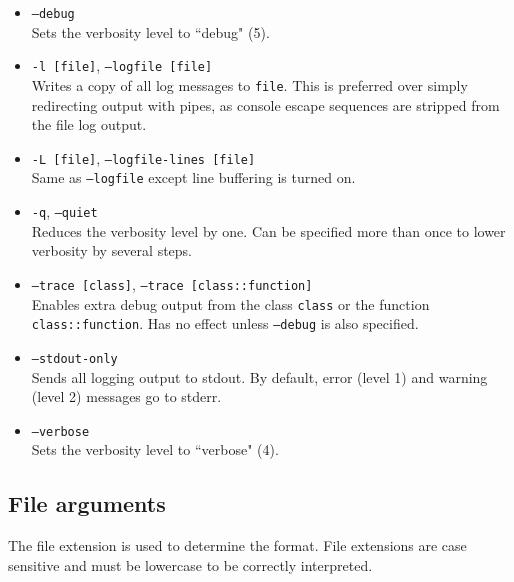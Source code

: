 \begin{itemize}

\item \texttt{--debug}\\
Sets the verbosity level to ``debug" (5).

\item \texttt{-l [file]}, \texttt{--logfile [file]}\\
Writes a copy of all log messages to \texttt{file}. This is preferred over simply redirecting output with pipes, as
console escape sequences are stripped from the file log output.

\item \texttt{-L [file]}, \texttt{--logfile-lines [file]}\\
Same as \texttt{--logfile} except line buffering is turned on.

\item \texttt{-q}, \texttt{--quiet}\\
Reduces the verbosity level by one. Can be specified more than once to lower verbosity by several steps.

\item \texttt{--trace [class]}, \texttt{--trace [class::function]} \\
Enables extra debug output from the class \texttt{class} or the function \texttt{class::function}. Has no effect unless
\texttt{--debug} is also specified.

\item \texttt{--stdout-only}\\
Sends all logging output to stdout. By default, error (level 1) and warning (level 2) messages go to stderr.

\item \texttt{--verbose}\\
Sets the verbosity level to ``verbose" (4).

\end{itemize}

\subsection{File arguments}
\label{import}

The file extension is used to determine the format. File extensions are case sensitive and must be lowercase to be
correctly interpreted.


